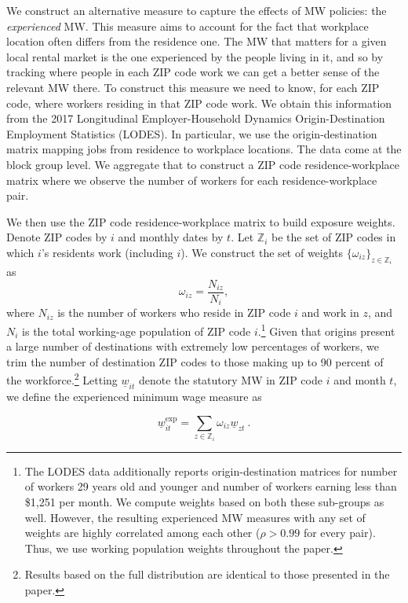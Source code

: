We construct an alternative measure to capture the effects of MW policies: the 
\textit{experienced} MW. This measure aims to account for the fact that workplace location 
often differs from the residence one. The MW that matters for a given local rental market 
is the one experienced by the people living in it, and so by tracking where people in 
each ZIP code work we can get a better sense of the relevant MW there.
To construct this measure we need to know, for each ZIP code, where workers residing in 
that ZIP code work. We obtain this information from the 2017 Longitudinal Employer-Household 
Dynamics Origin-Destination Employment Statistics (LODES). In particular, we use the 
origin-destination matrix mapping jobs from residence to workplace locations. The data 
come at the block group level. We aggregate that to construct a ZIP code residence-workplace 
matrix where we observe the number of workers for each residence-workplace pair.

We then use the ZIP code residence-workplace matrix to build exposure weights. Denote 
ZIP codes by $i$ and monthly dates by $t$. Let $\mathds{Z}_i$ be the set of ZIP codes in 
which $i$'s residents work (including $i$). We construct the set of weights 
$\{\omega_{iz}\}_{z \in \mathds{Z}_i}$ as $$\omega_{iz} = \frac{N_{iz}}{N_i} , $$ where 
$N_{iz}$ is the number of workers who reside in ZIP code $i$ and work in $z$, and $N_i$ 
is the total working-age population of ZIP code $i$.\footnote{The LODES data additionally 
	reports origin-destination matrices for number of workers 29 years old and younger  
	and number of workers earning less than \$1,251 per month. We compute weights based 
	on both these sub-groups as well. However, the resulting experienced MW measures with
	any set of weights are highly correlated among each other ($\rho>0.99$ for every pair).
	Thus, we use working population weights throughout the paper.} 
Given that origins present a large number of destinations with extremely low percentages of 
workers, we trim the number of destination ZIP codes to those making up to 90 percent of the 
workforce.\footnote{Results based on the full distribution are identical to those presented
	in the paper.} 
Letting $\underline{w}_{it}$ denote the statutory MW in ZIP code $i$ and month $t$, we 
define the experienced minimum wage measure as

\begin{equation}
	\underline{w}^{\text{exp}}_{it} = 
			\sum_{z \in \mathds{Z}_i} \omega_{iz} \underline{w}_{zt} \ . 
\end{equation}

